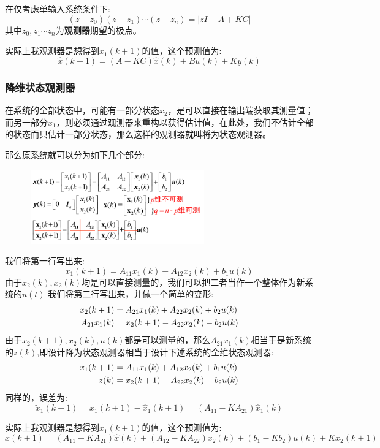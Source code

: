 \documentclass[12pt, a4paper, oneside]{ctexbook}
\begin{document}
在仅考虑单输入系统条件下:
$$
(z-z_0)(z-z_1)\cdots(z-z_n)=|zI-A+KC|
$$
其中$z_0,z_1\cdots z_n$为\textbf{观测器}期望的极点。

实际上我观测器是想得到$\widehat{x}_1(k+1)$的值，这个预测值为:
$$
\widehat{x}(k+1)=(A-KC)\widehat{x}(k)+Bu(k)+Ky(k)
$$
\subsubsection{降维状态观测器}
在系统的全部状态中，可能有一部分状态$x_2$，是可以直接在输出端获取其测量值；而另一部分$x_1$，则必须通过观测器来重构以获得估计值，在此处，我们不估计全部的状态而只估计一部分状态，那么这样的观测器就叫将为状态观测器。

那么原系统就可以分为如下几个部分:
\begin{figure}[htbp]
	\centering
	\includegraphics[width=7.6cm,height=3.2cm]{img/9_2.png}
\end{figure}
我们将第一行写出来:
$$
x_1(k+1)=A_{11}x_1(k)+A_{12}x_2(k)+b_1u(k)
$$
由于$x_2(k),x_2(k)$均是可以直接测量的，我们可以把二者当作一个整体作为新系统的$u(t)$
我们将第二行写出来，并做一个简单的变形:
$$
\begin{aligned}
x_2(k+1)&=A_{21}x_1(k)+A_{22}x_2(k)+b_2u(k)\notag \\
A_{21}x_1(k)&=x_2(k+1)-A_{22}x_2(k)-b_2u(k)\notag
\end{aligned}
$$
由于$x_2(k+1),x_2(k),u(k)$都是可以测量的，那么$A_{21}x_1(k)$相当于是新系统的$z(k)$,即设计降为状态观测器相当于设计下述系统的全维状态观测器:
$$
\begin{aligned}
x_1(k+1)&=A_{11}x_1(k)+A_{12}x_2(k)+b_1u(k)\notag \\
z(k)&=x_2(k+1)-A_{22}x_2(k)-b_2u(k)\notag
\end{aligned}
$$
同样的，误差为:
$$
\widetilde{x}_1(k+1)=x_1(k+1)-\widehat{x}_1(k+1)=(A_{11}-KA_{21})\widehat{x}_1(k)
$$

实际上我观测器是想得到$\widehat{x}_1(k+1)$的值，这个预测值为:
$$
\widehat{x}(k+1)=(A_{11}-KA_{21})\widehat{x}(k)+(A_{12}-KA_{22})x_2(k)+(b_1-Kb_2)u(k)+Kx_2(k+1)
$$
\end{document}
